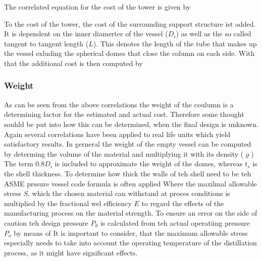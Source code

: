 			The correlated equation for the cost of the tower is given by
			
			To the cost of the tower, the cost of the surrounding support structure ist added. It is dependent
			on the inner diamerter of the vessel ($D_i$) as well as the so called tangent to tangent length ($L$). 
			This denotes the length of the tube that makes up the vessel exluding the spherical domes that 
			close the column on each side. With that the additional cost is then computed by
			
		\subsubsection{Weight}
			As can be seen from the above correlations the weight of the coulumn is a determining factor 
			for the estimated and actual cost. Therefore some thought souhld be put into how this can
			be determined, when the final design is unknown. Again several correlations have been applied
			to real life units which yield satisfactory results. In gerneral the weight of the empty vessel 
			can be computed by determing the volume of the material and multiplying it with its density ($\varrho$)
			The term $0.8 D_i$ is included to approximate the weight of the domes, whereas $t_s$ is the shell 
			thickness. To determine how thick the walls of teh shell need to be teh ASME prssure vessel code
			formula is often applied
			Where the maxilmal allowable stress $S$, which the chosen material can withstand at 
			proces conditions is multiplied by the fractional wel efficiency $E$ to regard the effects
			of the manufacturing process on the material strength. To ensure an error on the side of
			caution teh design pressure $P_d$ is calculated from teh actual operatiing pressure $P_o$
			by means of 
			It is important to consider, that the maximum allowable stress especially needs to take into account 
			the operating temperature of the distillation process, as it might have significant effects. 
			
